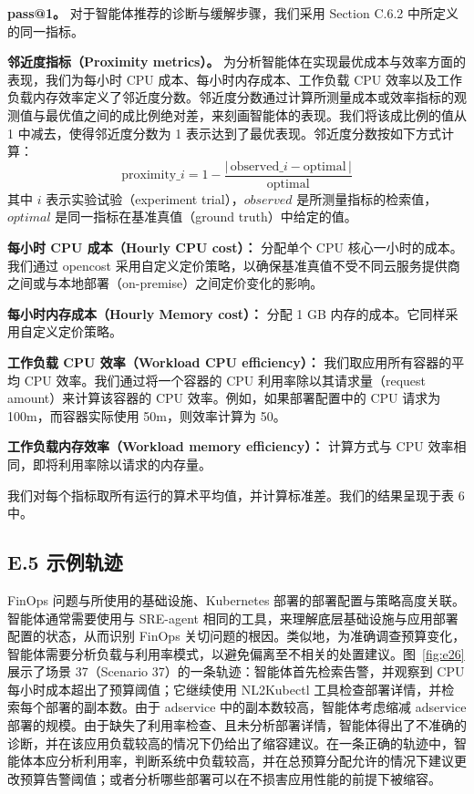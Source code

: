 \textbf{pass@1。} 对于智能体推荐的诊断与缓解步骤，我们采用 Section C.6.2 中所定义的同一指标。

\textbf{邻近度指标（Proximity metrics）。} 为分析智能体在实现最优成本与效率方面的表现，我们为每小时 CPU 成本、每小时内存成本、工作负载 CPU 效率以及工作负载内存效率定义了邻近度分数。邻近度分数通过计算所测量成本或效率指标的观测值与最优值之间的成比例绝对差，来刻画智能体的表现。我们将该成比例的值从 1 中减去，使得邻近度分数为 1 表示达到了最优表现。邻近度分数按如下方式计算：
\[
\mathrm{proximity}\_i = 1 - \frac{|\,\mathrm{observed}\_i - \mathrm{optimal}\,|}{\mathrm{optimal}}
\]
其中 $i$ 表示实验试验（experiment trial），$observed$ 是所测量指标的检索值，$optimal$ 是同一指标在基准真值（ground truth）中给定的值。

\textbf{每小时 CPU 成本（Hourly CPU cost）：} 分配单个 CPU 核心一小时的成本。我们通过 opencost 采用自定义定价策略，以确保基准真值不受不同云服务提供商之间或与本地部署（on-premise）之间定价变化的影响。

\textbf{每小时内存成本（Hourly Memory cost）：} 分配 1 GB 内存的成本。它同样采用自定义定价策略。

\textbf{工作负载 CPU 效率（Workload CPU efficiency）：} 我们取应用所有容器的平均 CPU 效率。我们通过将一个容器的 CPU 利用率除以其请求量（request amount）来计算该容器的 CPU 效率。例如，如果部署配置中的 CPU 请求为 100m，而容器实际使用 50m，则效率计算为 50。

\textbf{工作负载内存效率（Workload memory efficiency）：} 计算方式与 CPU 效率相同，即将利用率除以请求的内存量。

我们对每个指标取所有运行的算术平均值，并计算标准差。我们的结果呈现于表 6 中。

\subsection{E.5 示例轨迹}

FinOps 问题与所使用的基础设施、Kubernetes 部署的部署配置与策略高度关联。智能体通常需要使用与 SRE-agent 相同的工具，来理解底层基础设施与应用部署配置的状态，从而识别 FinOps 关切问题的根因。类似地，为准确调查预算变化，智能体需要分析负载与利用率模式，以避免偏离至不相关的处置建议。图~\ref{fig:e26} 展示了场景 37（Scenario 37）的一条轨迹：智能体首先检索告警，并观察到 CPU 每小时成本超出了预算阈值；它继续使用 NL2Kubectl 工具检查部署详情，并检索每个部署的副本数。由于 adservice 中的副本数较高，智能体考虑缩减 adservice 部署的规模。由于缺失了利用率检查、且未分析部署详情，智能体得出了不准确的诊断，并在该应用负载较高的情况下仍给出了缩容建议。在一条正确的轨迹中，智能体本应分析利用率，判断系统中负载较高，并在总预算分配允许的情况下建议更改预算告警阈值；或者分析哪些部署可以在不损害应用性能的前提下被缩容。

